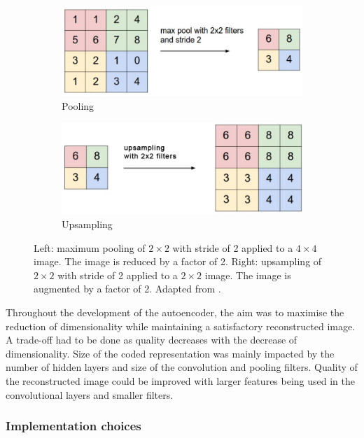 \begin{figure}[h!]
    \centering
    \begin{subfigure}{0.45\textwidth}
        \includegraphics[width=\textwidth]{dissertation/figures/pooling_operation.png}
        \caption{Pooling}
    \end{subfigure}
    \begin{subfigure}{0.45\textwidth}
        \includegraphics[width=\textwidth]{dissertation/figures/upsampling_operation.png}
        \caption{Upsampling}
    \end{subfigure}
    \caption{Left: maximum pooling of $2\times2$ with stride of 2 applied to a $4\times4$ image. The image is reduced by a factor of 2. Right: upsampling of $2\times2$ with stride of 2 applied to a $2\times2$ image. The image is augmented by a factor of 2. Adapted from \citet{karpath_cs231n}.}
    \label{fig:sampling}
\end{figure}

Throughout the development of the autoencoder, the aim was to maximise the reduction of dimensionality while maintaining a satisfactory reconstructed image. A trade-off had to be done as quality decreases with the decrease of dimensionality. Size of the coded representation was mainly impacted by the number of hidden layers and size of the convolution and pooling filters. Quality of the reconstructed image could be improved with larger features being used in the convolutional layers and smaller filters. 

\bigskip
\subsubsection{Implementation choices}
\hfill 
\hfill 

